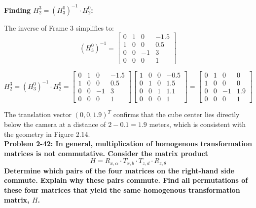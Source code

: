 \documentclass[12pt]{article}
\begin{document}
\textbf{Finding $H_2^3 = (H_3^0)^{-1} \cdot H_2^0$:}

The inverse of Frame 3 simplifies to:
\[
(H_3^0)^{-1} = 
\begin{bmatrix}
    0 & 1 &  0 & -1.5 \\
    1 & 0 &  0 &  0.5 \\
    0 & 0 & -1 &    3 \\
    0 & 0 &  0 &    1
\end{bmatrix}
\]

\[
H_2^3 = (H_3^0)^{-1} \cdot H_2^0 =
\begin{bmatrix}
    0 & 1 &  0 & -1.5 \\
    1 & 0 &  0 &  0.5 \\
    0 & 0 & -1 &    3 \\
    0 & 0 &  0 &    1
\end{bmatrix}
\begin{bmatrix} 
    1 & 0 & 0 & -0.5\\ 
    0 & 1 & 0 &  1.5\\ 
    0 & 0 & 1 &  1.1\\ 
    0 & 0 & 0 &  1
\end{bmatrix}
=
\begin{bmatrix}
    0 & 1 &  0 &   0\\
    1 & 0 &  0 &   0\\
    0 & 0 & -1 & 1.9\\
    0 & 0 &  0 &   1
\end{bmatrix}
\]

The translation vector $(0, 0, 1.9)^T$ confirms that the cube center lies directly below the camera
at a distance of $2 - 0.1 = 1.9$ meters, which is consistent with the geometry in Figure 2.14.\\

\textbf{Problem 2-42: In general, multiplication of homogenous transformation matrices is not commutative. Consider the
matrix product\[ H = R_{x,\alpha} \cdot T_{x,b} \cdot T_{z,d} \cdot R_{z,\theta} \]
Determine which pairs of the four matrices on the right-hand side commute. Explain why these pairs
commute. Find all permutations of these four matrices that yield the same homogenous transformation
matrix, $H$.} \\
\end{document}
